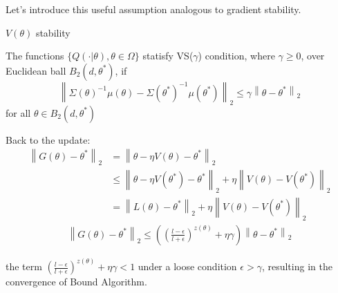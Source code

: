 \documentclass{beamer}
\begin{document}
\begin{frame}
\centering
\begin{block}{}
  Let's introduce this useful assumption analogous to gradient stability.
  \begin{definition}{$V(\theta)$ stability}
    
    The functions $\{Q(\cdot|\theta), \theta \in \Omega\}$ statisfy VS($\gamma$) condition, where $\gamma \geq 0$, over Euclidean ball $B_2(d, \theta^*)$,
    if 
    \begin{equation}
       \left\lVert\Sigma(\theta)^{-1}\mu(\theta) - \Sigma(\theta^*)^{-1}\mu(\theta^*)\right\lVert_2 \leq \gamma  \left\lVert \theta - \theta^*\right\lVert_2
    \end{equation}
    for all $\theta \in B_2(d, \theta^*)$
    \label{Vstable}
  \end{definition}

\end{block}
\end{frame}


\begin{frame}
 
  \begin{block}{}
    Back to the update:
    \begin{equation}
      \begin{aligned}
        \left\lVert G(\theta) - \theta^* \right\lVert_2 & = \left\lVert \theta - \eta V(\theta)- \theta^* \right\lVert_2 \nonumber \\
        & \leq \left\lVert \theta - \eta V(\theta^*)- \theta^* \right\lVert_2 + \eta \left\lVert  V(\theta)-V(\theta^*) \right\lVert_2 \\
        & = \left\lVert L(\theta)- \theta^* \right\lVert_2 + \eta \left\lVert  V(\theta)-V(\theta^*) \right\lVert_2 
      \end{aligned}
     \end{equation}
    \begin{equation}
      \begin{aligned}
        \left\lVert G(\theta) - \theta^* \right\lVert_2  \leq ((\frac{l - \epsilon}{l+\epsilon} )^{z(\theta)} + \eta \gamma)\left\lVert \theta - \theta^* \right\lVert_2 
      \end{aligned}
     \end{equation}
  
  \end{block}
  the term $(\frac{l - \epsilon}{l+\epsilon} )^{z(\theta)} + \eta \gamma < 1$ under a loose condition $\epsilon > \gamma$, resulting in the convergence of Bound Algorithm.
 
  \end{frame}
\end{document}
